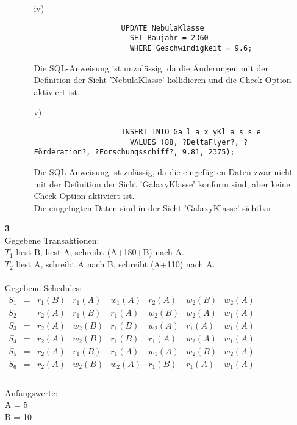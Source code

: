 \documentclass[a4paper,11pt,fleqn]{scrartcl}
\begin{document}
\begin{enumerate}
\begin{enumerate}
\begin{enumerate}
				\item[iv)]
				\begin{verbatim}
					UPDATE NebulaKlasse
					  SET Baujahr = 2360
					  WHERE Geschwindigkeit = 9.6;
				\end{verbatim}
				Die SQL-Anweisung ist unzulässig, da die Änderungen mit der Definition der Sicht 'NebulaKlasse' kollidieren und die Check-Option aktiviert ist.

				\item[v)]
				\begin{verbatim}
					INSERT INTO Ga l a x yKl a s s e
					  VALUES (88, ?DeltaFlyer?, ?Förderation?, ?Forschungsschiff?, 9.81, 2375);
				\end{verbatim}
				Die SQL-Anweisung ist zulässig, da die eingefügten Daten zwar nicht mit der Definition der Sicht 'GalaxyKlasse' konform sind, aber keine Check-Option aktiviert ist.\\
				Die eingefügten Daten sind in der Sicht 'GalaxyKlasse' sichtbar.
			\end{enumerate}
		\end{enumerate}

		\newpage
		\item[\textbf{3}] \quad \\
			Gegebene Transaktionen:\\
			$T_1$ liest B, liest A, schreibt (A+180+B) nach A.\\
			$T_2$ liest A, schreibt A nach B, schreibt (A+110) nach A.\\
			\\
			Gegebene Schedules:\\
			\(
			\begin{array}{lcccccccccc}
				S_1 &=& r_1(B) & r_1(A) & w_1(A) & r_2(A) & w_2(B) & w_2(A) \\
				S_2 &=& r_2(A) & r_1(B) & r_1(A) & w_2(B) & w_2(A) & w_1(A) \\
				S_3 &=& r_2(A) & w_2(B) & r_1(B) & w_2(A) & r_1(A) & w_1(A) \\
				S_4 &=& r_2(A) & w_2(B) & r_1(B) & r_1(A) & w_2(A) & w_1(A) \\
				S_5 &=& r_2(A) & r_1(B) & r_1(A) & w_1(A) & w_2(B) & w_2(A) \\
				S_6 &=& r_2(A) & w_2(B) & w_2(A) & r_1(B) & r_1(A) & w_1(A) \\
			\end{array}
			\)
			\\ \\
			Anfangswerte:\\
			A = 5\\
			B = 10


\end{enumerate}
\end{document}
